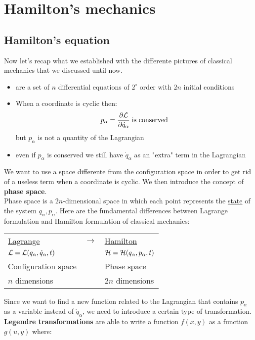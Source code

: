 \chapter{Hamilton's mechanics}
\section{Hamilton's equation}
Now let's recap what we established with the differente pictures of classical mechanics that we discussed until now.
\begin{itemize}
    \item \eleref\;are a set of $n$ differential equations of $2^\circ$ order with $2n$ initial conditions
    \item When a coordinate is cyclic then: \begin{equation}
        p_{\alpha} = \pdv{\lagr}{\dot{q}_{\alpha}}\;\text{is conserved}
    \end{equation}
    but $p_{\alpha}$ is not a quantity of the Lagrangian
    \item even if $p_\alpha$ is conserved we still have $\dot{q}_{\alpha}$ as an "extra" term in the Lagrangian
\end{itemize}
We want to use a space differente from the configuration space in order to get rid of a useless term when a coordinate is cyclic. We then introduce the concept of \textbf{phase space}.\\
Phase space is a $2n$-dimensional space in which each point represents the \underline{state} of the system ${q_{\alpha},p_{\alpha}}$.
Here are the fundamental differences between Lagrange formulation and Hamilton formulation of classical mechanics:
\begin{table}[H]
    \centering
    \begin{tabular}{lll}
        \underline{Lagrange} & $\longrightarrow$ &\underline{Hamilton}\\
        $\mathcal{L}=\mathcal{L}(q_{\alpha},\dot{q}_{\alpha},t)$ & &$\mathcal{H}=\mathcal{H}(q_{\alpha},p_{\alpha},t)$\\
        Configuration space & &Phase space\\
        $n$ dimensions & &$2n$ dimensions
    \end{tabular}
\end{table}
Since we want to find a new function related to the Lagrangian that contains $p_{\alpha}$ as a variable instead of $\dot{q}_{\alpha}$, we need to introduce a certain type of transformation.\\
\textbf{Legendre transformations} are able to write a function $f(x,y)$ as a function $g(u,y)$ where:
